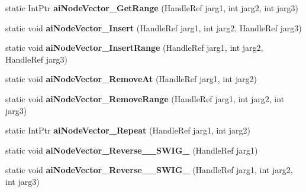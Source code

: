 \begin{DoxyCompactItemize}
\item 
\hypertarget{class_assimp_p_i_n_v_o_k_e_a7fba9edb9f1901b70899e413c0235199}{static Int\+Ptr {\bfseries ai\+Node\+Vector\+\_\+\+Get\+Range} (Handle\+Ref jarg1, int jarg2, int jarg3)}\label{class_assimp_p_i_n_v_o_k_e_a7fba9edb9f1901b70899e413c0235199}

\item 
\hypertarget{class_assimp_p_i_n_v_o_k_e_afb98f1f270b5afa3471a2194eff55089}{static void {\bfseries ai\+Node\+Vector\+\_\+\+Insert} (Handle\+Ref jarg1, int jarg2, Handle\+Ref jarg3)}\label{class_assimp_p_i_n_v_o_k_e_afb98f1f270b5afa3471a2194eff55089}

\item 
\hypertarget{class_assimp_p_i_n_v_o_k_e_acb9b86c28b3a24eefaae0dc8663e07fc}{static void {\bfseries ai\+Node\+Vector\+\_\+\+Insert\+Range} (Handle\+Ref jarg1, int jarg2, Handle\+Ref jarg3)}\label{class_assimp_p_i_n_v_o_k_e_acb9b86c28b3a24eefaae0dc8663e07fc}

\item 
\hypertarget{class_assimp_p_i_n_v_o_k_e_a49d79da99114ab300cb530788d1b26b3}{static void {\bfseries ai\+Node\+Vector\+\_\+\+Remove\+At} (Handle\+Ref jarg1, int jarg2)}\label{class_assimp_p_i_n_v_o_k_e_a49d79da99114ab300cb530788d1b26b3}

\item 
\hypertarget{class_assimp_p_i_n_v_o_k_e_abfba71f72c6a4e25651de2b1fd5b2fd0}{static void {\bfseries ai\+Node\+Vector\+\_\+\+Remove\+Range} (Handle\+Ref jarg1, int jarg2, int jarg3)}\label{class_assimp_p_i_n_v_o_k_e_abfba71f72c6a4e25651de2b1fd5b2fd0}

\item 
\hypertarget{class_assimp_p_i_n_v_o_k_e_afee648362a9dca7fa9266a948f2e9522}{static Int\+Ptr {\bfseries ai\+Node\+Vector\+\_\+\+Repeat} (Handle\+Ref jarg1, int jarg2)}\label{class_assimp_p_i_n_v_o_k_e_afee648362a9dca7fa9266a948f2e9522}

\item 
\hypertarget{class_assimp_p_i_n_v_o_k_e_a86ada0c0dfaa176ed8447f574f1b5b41}{static void {\bfseries ai\+Node\+Vector\+\_\+\+Reverse\+\_\+\+\_\+\+S\+W\+I\+G\+\_} (Handle\+Ref jarg1)}\label{class_assimp_p_i_n_v_o_k_e_a86ada0c0dfaa176ed8447f574f1b5b41}

\item 
\hypertarget{class_assimp_p_i_n_v_o_k_e_a9de6c07a50c0765b171ed3eb3438e870}{static void {\bfseries ai\+Node\+Vector\+\_\+\+Reverse\+\_\+\+\_\+\+S\+W\+I\+G\+\_} (Handle\+Ref jarg1, int jarg2, int jarg3)}\label{class_assimp_p_i_n_v_o_k_e_a9de6c07a50c0765b171ed3eb3438e870}


\end{DoxyCompactItemize}
